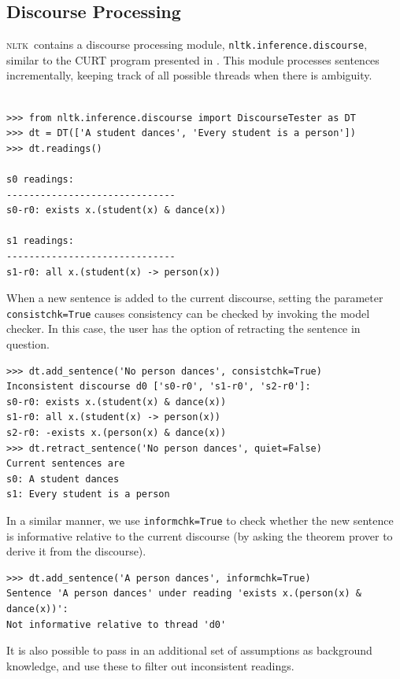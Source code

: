 \documentclass[11pt, a4paper]{article}
\newcommand{\NLTK}{\textsc{nltk}}
\newcommand{\dhgcode}[1]{{\tt #1}}
\begin{document}
\subsection{Discourse Processing}
\NLTK\ contains a discourse processing module,
\texttt{nltk.inference.discourse}, similar to the CURT program
presented in \cite{BB}.  This module processes sentences incrementally,
keeping track of all possible threads when there is ambiguity.
\begin{Verbatim}[baselinestretch=.5]

>>> from nltk.inference.discourse import DiscourseTester as DT
>>> dt = DT(['A student dances', 'Every student is a person'])
>>> dt.readings()

s0 readings:
------------------------------
s0-r0: exists x.(student(x) & dance(x))

s1 readings:
------------------------------
s1-r0: all x.(student(x) -> person(x))
\end{Verbatim}
When a new sentence is added to the current discourse, setting the
parameter \texttt{consistchk=True} causes consistency can be checked
by invoking the model checker. In this case, the user has the option
of retracting the sentence in question.
\begin{Verbatim}
>>> dt.add_sentence('No person dances', consistchk=True)
Inconsistent discourse d0 ['s0-r0', 's1-r0', 's2-r0']:
s0-r0: exists x.(student(x) & dance(x))
s1-r0: all x.(student(x) -> person(x))
s2-r0: -exists x.(person(x) & dance(x))
>>> dt.retract_sentence('No person dances', quiet=False)
Current sentences are 
s0: A student dances
s1: Every student is a person
\end{Verbatim}
In a similar manner, we use \texttt{informchk=True} to check whether
the new sentence is informative relative to the current discourse (by
asking the theorem prover to derive it from the discourse).
\begin{Verbatim}
>>> dt.add_sentence('A person dances', informchk=True)
Sentence 'A person dances' under reading 'exists x.(person(x) & dance(x))':
Not informative relative to thread 'd0'
\end{Verbatim}
It is also possible to pass in an additional set of assumptions as
background knowledge, and use these to filter out inconsistent readings.



\end{document}
